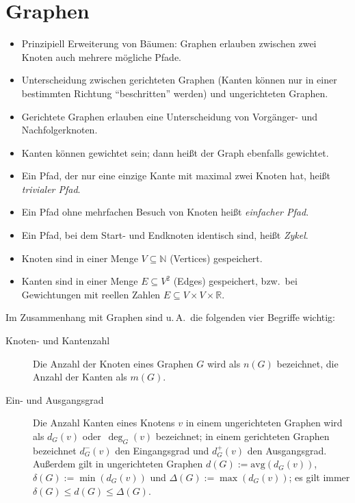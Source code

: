 \section{Graphen}
\begin{itemize}
  \item Prinzipiell Erweiterung von Bäumen: Graphen erlauben zwischen zwei Knoten auch mehrere mögliche Pfade.
  \item Unterscheidung zwischen gerichteten Graphen (Kanten können nur in einer bestimmten Richtung \enquote{beschritten} werden) und ungerichteten Graphen.
  \item Gerichtete Graphen erlauben eine Unterscheidung von Vorgänger- und Nachfolgerknoten.
  \item Kanten können gewichtet sein; dann heißt der Graph ebenfalls gewichtet.
  \item Ein Pfad, der nur eine einzige Kante mit maximal zwei Knoten hat, heißt \emph{trivialer Pfad}.
  \item Ein Pfad ohne mehrfachen Besuch von Knoten heißt \emph{einfacher Pfad}.
  \item Ein Pfad, bei dem Start- und Endknoten identisch sind, heißt \emph{Zykel}.
  \item Knoten sind in einer Menge $V \subseteq \mathbb{N}$ (Vertices) gespeichert.
  \item Kanten sind in einer Menge $E \subseteq V^2$ (Edges) gespeichert, bzw.~bei Gewichtungen mit reellen Zahlen $E \subseteq V\times V\times\mathbb{R}$.
\end{itemize}

Im Zusammenhang mit Graphen sind u.\,A.~die folgenden vier Begriffe wichtig:
\begin{description}
    \item[Knoten- und Kantenzahl] Die Anzahl der Knoten eines Graphen $G$ wird als $n(G)$ bezeichnet, die Anzahl der Kanten als $m(G)$.
    \item[Ein- und Ausgangsgrad] Die Anzahl Kanten eines Knotens $v$ in einem ungerichteten Graphen wird als $d_G(v)$ oder~$\deg_G(v)$ bezeichnet; in einem gerichteten Graphen bezeichnet $d^-_G(v)$ den Eingangsgrad und $d^+_G(v)$ den Ausgangsgrad.
    Außerdem gilt in ungerichteten Graphen $d(G) := \mathrm{avg}(d_G(v))$, $\delta(G) := \min(d_G(v))$ und $\Delta(G) := \max(d_G(v))$; es gilt immer $\delta(G) \leq d(G) \leq \Delta(G)$.
\end{description}

